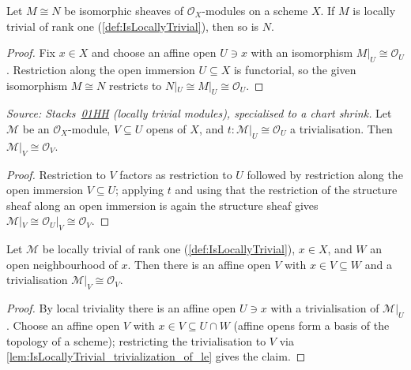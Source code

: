 \begin{lemma}\leanok
  \label{lem:locally_trivial_of_iso}
  Let \(M \cong N\) be isomorphic sheaves of \(\mathcal O_X\)-modules on a
  scheme \(X\).  If \(M\) is locally trivial of rank one
  (\cref{def:IsLocallyTrivial}), then so is \(N\).
\end{lemma}
\begin{proof}\leanok
  Fix \(x \in X\) and choose an affine open \(U \ni x\) with an isomorphism
  \(M|_U \cong \mathcal O_U\).  Restriction along the open immersion
  \(U \subseteq X\) is functorial, so the given isomorphism \(M \cong N\)
  restricts to \(N|_U \cong M|_U \cong \mathcal O_U\).
\end{proof}

\begin{lemma}\leanok
  \label{lem:IsLocallyTrivial_trivialization_of_le}
  \textit{Source: Stacks~\href{https://stacks.math.columbia.edu/tag/01HH}{01HH}
  (locally trivial modules), specialised to a chart shrink.}
  Let \(\mathcal M\) be an \(\mathcal O_X\)-module, \(V \subseteq U\) opens of
  \(X\), and \(t : \mathcal M|_U \cong \mathcal O_U\) a trivialisation. Then
  \(\mathcal M|_V \cong \mathcal O_V\).
\end{lemma}
\begin{proof}\leanok
  Restriction to \(V\) factors as restriction to \(U\) followed by
  restriction along the open immersion \(V \subseteq U\); applying \(t\) and
  using that the restriction of the structure sheaf along an open immersion
  is again the structure sheaf gives \(\mathcal M|_V \cong \mathcal O_U|_V
  \cong \mathcal O_V\).
\end{proof}

\begin{lemma}\leanok
  \label{cor:IsLocallyTrivial_exists_affine_trivializing_le}
  Let \(\mathcal M\) be locally trivial of rank one
  (\cref{def:IsLocallyTrivial}), \(x \in X\), and \(W\) an open neighbourhood
  of \(x\). Then there is an affine open \(V\) with \(x \in V \subseteq W\)
  and a trivialisation \(\mathcal M|_V \cong \mathcal O_V\).
\end{lemma}
\begin{proof}\leanok
  By local triviality there is an affine open \(U \ni x\) with a
  trivialisation of \(\mathcal M|_U\). Choose an affine open \(V\) with
  \(x \in V \subseteq U \cap W\) (affine opens form a basis of the topology
  of a scheme); restricting the trivialisation to \(V\) via
  \cref{lem:IsLocallyTrivial_trivialization_of_le} gives the claim.
\end{proof}

